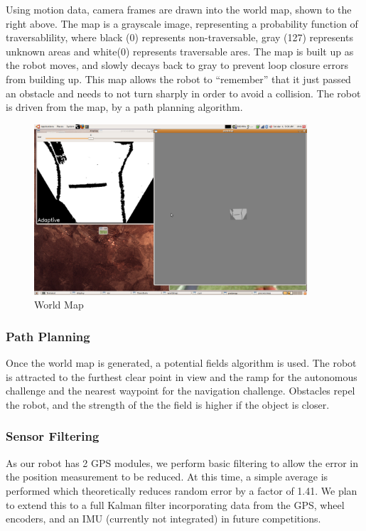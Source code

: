 Using motion data, camera frames are drawn into the world map, shown to the right above. The map is a grayscale image, representing a probability function of traversablility, where black (0) represents non-traversable, gray (127) represents unknown areas and white(0) represents traversable ares. The map is built up as the robot moves, and slowly decays back to gray to prevent loop closure errors from building up. This map allows the robot to ``remember'' that it just passed an obstacle and needs to not turn sharply in order to avoid a collision. The robot is driven from the map, by a path planning algorithm.

\begin{figure}[H]
\begin{center}
\includegraphics[width=4in]{./pics/map.png}
\caption{World Map}
\label{FIG:Map}
\end{center}
\end{figure}

\subsubsection{Path Planning}

Once the world map is generated, a potential fields algorithm is used. The robot is attracted to the furthest clear point in view and the ramp for the autonomous challenge and the nearest waypoint for the navigation challenge. Obstacles repel the robot, and the strength of the the field is higher if the object is closer.

\subsubsection{Sensor Filtering}

As our robot has 2 GPS modules, we perform basic filtering to allow the error in the position measurement to be reduced. At this time, a simple average is performed which theoretically reduces random error by a factor of 1.41. We plan to extend this to a full Kalman filter incorporating data from the GPS, wheel encoders, and an IMU (currently not integrated) in future competitions.

